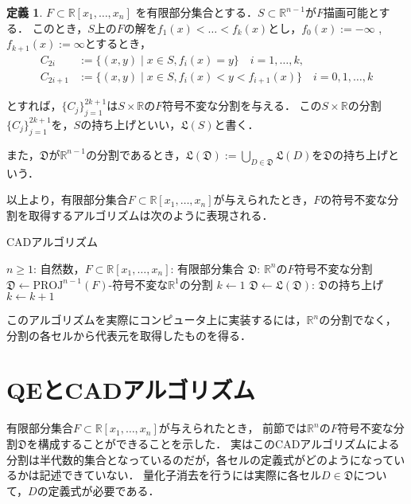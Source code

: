 \documentclass[uplatex, dvipdfmx]{jsarticle}
\newcommand{\R}{\mathbb{R}}
\newcommand{\PROJ}{\mathrm{PROJ}}
\theoremstyle{definition}
\newtheorem{definition}{定義}[section]
\begin{document}
\begin{definition}
$ F \subset \mathbb{R}[x_1,\dots,x_n] $ を有限部分集合とする．$ S \subset \mathbb{R}^{n-1} $が$ F $描画可能とする．
このとき，$ S $上の$ F $の解を$ f_1(x)< \dots <f_k(x) $とし，$ f_0(x) := -\infty $ , $ f_{k+1}(x) := \infty $とするとき，
\begin{align*}
  C_{2i} &:= \{(x,y) \mid  x \in S, f_i(x) = y \} \quad i = 1,\dots, k,\\
  C_{2i+1} &:= \{(x,y) \mid x \in S, f_{i}(x)<y<f_{i+1}(x) \} \quad i = 0,1, \dots, k 
\end{align*}

とすれば，$\{C_j\}_{j=1}^{2k+1}$は$ S \times \mathbb{R} $の$F$符号不変な分割を与える．
この$ S \times \mathbb{R} $の分割$ \{C_j\}_{j=1}^{2k+1} $を，$ S $の持ち上げといい，$ \mathfrak{L}(S) $と書く．

また，$\mathfrak{D}$が$\R^{n-1}$の分割であるとき，$\mathfrak{L}(\mathfrak{D}) := \bigcup_{D \in \mathfrak{D}}\mathfrak{L}(D)$を$\mathfrak{D}$の持ち上げという．
\end{definition}

以上より，有限部分集合$F \subset \R[x_1, \dots, x_n]$が与えられたとき，$F$の符号不変な分割を取得するアルゴリズムは次のように表現される．

\begin{algorithm}
    \caption{CADアルゴリズム}
    \begin{algorithmic}[1]
    \REQUIRE $n \geq 1$: 自然数，$F \subset \R[x_1, \dots, x_n]$: 有限部分集合
    \ENSURE $\mathfrak{D}$: $\R^n$の$F$符号不変な分割
    \STATE $\mathfrak{D} \leftarrow \text{$\PROJ^{n-1}(F)$-符号不変な$\R^1$の分割}$
    \STATE $k \leftarrow 1$
    \STATE $\mathfrak{D} \leftarrow \text{$\mathfrak{L}(\mathfrak{D})$: $\mathfrak{D}$の持ち上げ}$
    \STATE $k \leftarrow k+1$
    \ENDWHILE
    \end{algorithmic}
\end{algorithm}

このアルゴリズムを実際にコンピュータ上に実装するには，$\R^n$の分割でなく，分割の各セルから代表元を取得したものを得る．

\section{QEとCADアルゴリズム}
有限部分集合$F \subset \R[x_1, \dots, x_n]$が与えられたとき，
前節では$\R^n$の$F$符号不変な分割$\mathfrak{D}$を構成することができることを示した．
実はこのCADアルゴリズムによる分割は半代数的集合となっているのだが，各セルの定義式がどのようになっているかは記述できていない．
量化子消去を行うには実際に各セル$D \in \mathfrak{D}$について，$D$の定義式が必要である．
\end{document}
